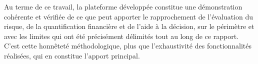 Au terme de ce travail, la plateforme développée constitue une démonstration cohérente et vérifiée de ce que peut apporter le rapprochement de l'évaluation du risque, de la quantification financière et de l'aide à la décision, sur le périmètre et avec les limites qui ont été précisément délimités tout au long de ce rapport. C'est cette honnêteté méthodologique, plus que l'exhaustivité des fonctionnalités réalisées, qui en constitue l'apport principal.
